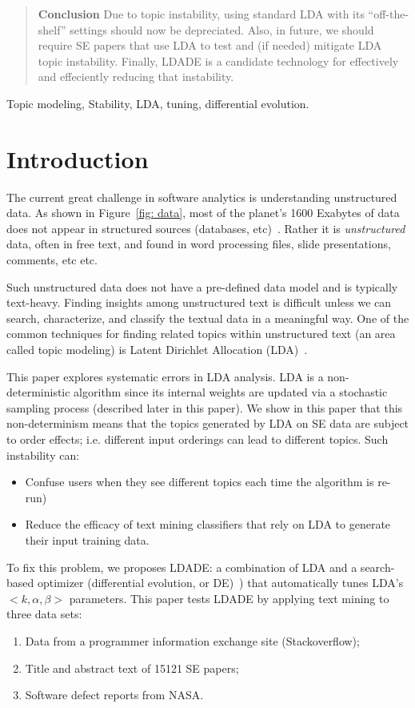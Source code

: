 \documentclass[twocolumn,5p,sort&compress]{elsarticle}
\newcommand{\bi}{\begin{itemize}}
\newcommand{\ei}{\end{itemize}}
\newcommand{\be}{\begin{enumerate}}
\newcommand{\ee}{\end{enumerate}}
\theoremstyle{break}
\begin{document}
\begin{frontmatter}
\begin{abstract}
\noindent
\textbf{Conclusion}
  Due to topic instability,
  using standard LDA with its ``off-the-shelf'' settings should now be depreciated.
  Also, in future,
we should require
SE
papers that use
LDA
to
test and (if needed) mitigate LDA topic instability.
  Finally, LDADE is a candidate technology for effectively and effeciently reducing that instability.  
\end{abstract}

\begin{keyword}
Topic modeling, Stability, LDA, tuning, differential evolution.
\end{keyword}

\end{frontmatter}



\section{Introduction}
\label{sect:intro} The current great challenge in software analytics
is understanding unstructured data. As shown in Figure~\ref{fig:
data}, most of the planet's 1600 Exabytes of data does not appear
in structured sources (databases, etc)~\cite{nadkarni2014structured}.
Rather it is {\em unstructured} data, often in free text, and found
in word processing files, slide presentations, comments, etc etc.

Such unstructured data does not have a pre-defined data model and
is typically text-heavy. Finding insights among unstructured text
is  difficult unless we can search, characterize, and classify the
textual data in a meaningful way. One of the common techniques for
finding related topics within unstructured text (an area called
topic modeling) is Latent Dirichlet Allocation (LDA)~\cite{blei2003latent}.

This paper explores systematic errors in LDA analysis.
LDA is a non-deterministic algorithm since its internal weights are updated via a stochastic sampling process (described
later in this paper).
We show in this paper that this non-determinism means that the  topics generated by LDA on
SE data are subject to order effects; i.e. different input orderings
can lead to different topics.
Such instability can:
\bi
\item
  Confuse users when they see different topics each time
the algorithm is re-run) 
\item
  Reduce the efficacy of text mining classifiers that rely on LDA to
  generate their input training data.
\ei
To fix this problem,
we proposes LDADE: a  combination of LDA and a search-based optimizer (differential evolution, or DE)~\cite{storn1997differential})
that automatically tunes LDA's \mbox{$<k,\alpha,\beta>$} parameters. This paper tests LDADE 
by applying text mining to
three data sets:
\be
\item Data from a programmer information exchange site (Stackoverflow);
  \item Title and abstract text of
    15121 SE papers;
  \item Software defect reports from NASA.
\ee
    
\end{document}

